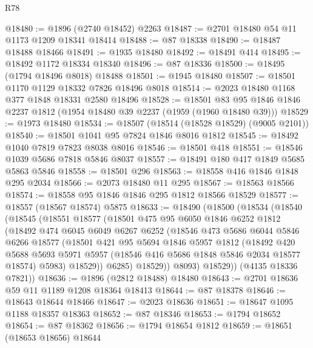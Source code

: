 \begin{lexlean}{R78}
\begin{coremodule}
@18480 := @1896 (@2740 @18452) @2263
@18487 := @2701 @18480 @54 @11 @1173 @1209 @18341 @18414
@18488 := @87 @18338
@18490 := @18487 @18488 @18466
@18491 := @1935 @18480
@18492 := @18491 @414
@18495 := @18492 @1172 @18334 @18340
@18496 := @87 @18336
@18500 := @18495 (@1794 @18496 @8018) @18488
@18501 := @1945 @18480
@18507 := @18501 @1170 @1129 @18332 @7826 @18496 @8018
@18514 := @2023 @18480 @1168 @377 @1848 @18331 @2580 @18496
@18528 := @18501 @83 @95 @1846 @1846 @2237 @1812 (@1954 @18480 @39 @2237 (@1959 (@1960 @18480 @39)))
@18529 := @1973 @18480
@18534 := @18507 (@18514 (@18528 @18529) (@9005 @2101))
@18540 := @18501 @1041 @95 @7824 @1846 @8016 @1812
@18545 := @18492 @1040 @7819 @7823 @8038 @8016
@18546 := @18501 @418
@18551 := @18546 @1039 @5686 @7818 @5846 @8037
@18557 := @18491 @180 @417 @1849 @5685 @5863 @5846
@18558 := @18501 @296
@18563 := @18558 @416 @1846 @1848 @295 @2034
@18566 := @2073 @18480 @11 @295
@18567 := @18563 @18566
@18574 := @18558 @95 @1846 @1846 @295 @1812 @18566 @18529
@18577 := @18557 (@18567 @18574) @5875
@18633 := @18490
    (@18500
      (@18534
        (@18540
          (@18545
            (@18551
              @18577
              (@18501
                @475
                @95
                @6050
                @1846
                @6252
                @1812
                (@18492
                  @474
                  @6045
                  @6049
                  @6267
                  @6252
                  (@18546
                    @473
                    @5686
                    @6044
                    @5846
                    @6266
                    @18577
                    (@18501
                      @421
                      @95
                      @5694
                      @1846
                      @5957
                      @1812
                      (@18492
                        @420
                        @5688
                        @5693
                        @5971
                        @5957
                        (@18546 @416 @5686 @1848 @5846 @2034 @18577 @18574)
                        @5983)
                      @18529))
                  @6285)
                @18529))
            @8093)
          @18529))
      (@4135 @18336 @7821))
@18636 := @1896 (@2812 @18488) @18480
@18643 := @2701 @18636 @59 @11 @1189 @1208 @18364 @18413
@18644 := @87 @18378
@18646 := @18643 @18644 @18466
@18647 := @2023 @18636
@18651 := @18647 @1095 @1188 @18357 @18363
@18652 := @87 @18346
@18653 := @1794 @18652
@18654 := @87 @18362
@18656 := @1794 @18654 @1812
@18659 := @18651 (@18653 @18656) @18644

\end{coremodule}
\end{lexlean}

